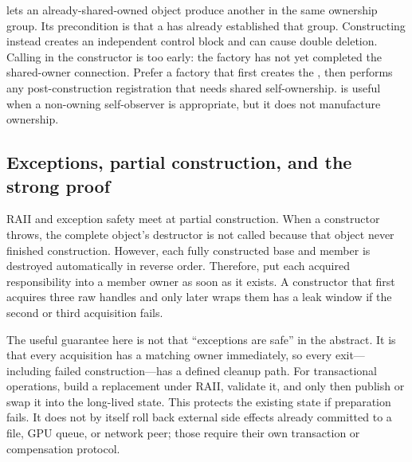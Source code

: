  lets an already-shared-owned object produce another  in the same ownership group. Its precondition is that a  has already established that group. Constructing  instead creates an independent control block and can cause double deletion. Calling  in the constructor is too early: the factory has not yet completed the shared-owner connection. Prefer a factory that first creates the , then performs any post-construction registration that needs shared self-ownership.  is useful when a non-owning self-observer is appropriate, but it does not manufacture ownership.

\subsection{Exceptions, partial construction, and the strong proof}\label{05-engine-i-ch004-exceptions-partial-construction-and-the-strong-proof}

\hypertarget{05-engine-i-ch004-exceptions-partial-construction-and-the-strong-proof}{}

RAII and exception safety meet at partial construction. When a constructor throws, the complete object's destructor is not called because that object never finished construction. However, each fully constructed base and member is destroyed automatically in reverse order. Therefore, put each acquired responsibility into a member owner as soon as it exists. A constructor that first acquires three raw handles and only later wraps them has a leak window if the second or third acquisition fails.

The useful guarantee here is not that ``exceptions are safe'' in the abstract. It is that every acquisition has a matching owner immediately, so every exit---including failed construction---has a defined cleanup path. For transactional operations, build a replacement under RAII, validate it, and only then publish or swap it into the long-lived state. This protects the existing state if preparation fails. It does not by itself roll back external side effects already committed to a file, GPU queue, or network peer; those require their own transaction or compensation protocol.

